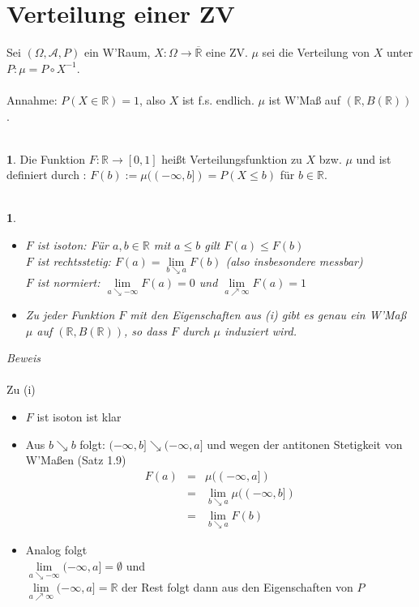 \documentclass[10pt,a4paper]{report}
\newcommand{\R}{\mathbb{R}}
\numberwithin{equation}{section}
\numberwithin{figure}{section}
\theoremstyle{plain}
\theoremstyle{definition}
\newtheorem{defn}{\protect\definitionname}[section]
\theoremstyle{plain}
\newtheorem{prop}{\protect\propositionname}[section]
\theoremstyle{definition}
\theoremstyle{remark}
\theoremstyle{plain}
\theoremstyle{plain}
\theoremstyle{plain}
\theoremstyle{plain}
\theoremstyle{plain}
\providecommand{\definitionname}{Definition}
\providecommand{\propositionname}{Satz}
\newcommand{\1}{ \mathbb{1} } %
\begin{document}
\section{Verteilung einer ZV}
Sei $(\Omega,\mathcal{A},P)$ ein W'Raum, $X:\Omega \to \overline{\R}$ eine ZV. $\mu$ sei die Verteilung von $X$ unter $P: \mu=P\circ X^{-1}$.\\\\
Annahme: $P(X\in \R)=1$, also $X$ ist f.s. endlich. $\mu$ ist W'Maß auf $(\R,B(\R))$.\\\\
\begin{defn}
  Die Funktion $F:\R \to [0,1]$ heißt Verteilungsfunktion zu $X$ bzw. $\mu$ und ist definiert durch : $F(b):=\mu((-\infty,b])=P(X\leq b)$ für $b \in \R$.\\\\
\end{defn}
\begin{prop}
  \begin{itemize}
  \item[(i)] $F$ ist isoton: Für $a,b \in \R$ mit $a \leq b$ gilt $F(a)\leq F(b)$\\
    $F$ ist rechtsstetig: $F(a)=\lim\limits_{b\searrow a}F(b)$ (also insbesondere messbar)\\
    $F$ ist normiert: $\lim\limits_{a\searrow -\infty}F(a)=0$ und
    $\lim\limits_{a\nearrow \infty}F(a)=1$
  \item[(ii)] Zu jeder Funktion $F$ mit den Eigenschaften aus (i) gibt
    es genau ein W'Maß $\mu$ auf $(\R,B(\R))$, so dass $F$ durch $\mu$
    induziert wird.
  \end{itemize}
\end{prop}
\textit{Beweis}\\\\
Zu (i)
\begin{itemize}
\item $F$ ist isoton ist klar
\item Aus $b \searrow b$ folgt: $(-\infty,b] \searrow (-\infty,a]$ und wegen der antitonen Stetigkeit von W'Maßen (Satz 1.9)
\begin{eqnarray*}
F(a)&=&\mu((-\infty,a])\\
&=& \lim\limits_{b\searrow a} \mu((-\infty,b]) \\
&=& \lim\limits_{b\searrow a} F(b)
\end{eqnarray*}
\item Analog folgt\\
$\lim\limits_{a\searrow -\infty} (-\infty,a]=\emptyset$ und\\
$\lim\limits_{a\nearrow \infty} (-\infty,a]=\R$ der Rest folgt dann aus den Eigenschaften von $P$
\end{itemize}
\end{document}
